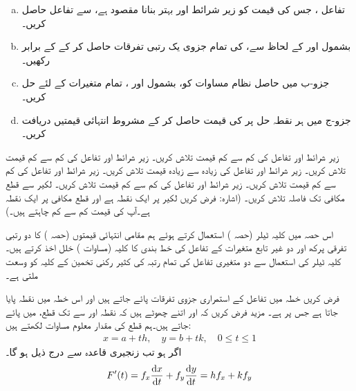 \begin{enumerate}[a.]
\item
تفاعل ،  جس کی قیمت کو زیر شرائط  اور  بہتر بنانا مقصود ہے، سے تفاعل  حاصل کریں۔
\item
 بشمول  اور  کے لحاظ سے،  کی تمام جزوی یک رتبی تفرقات حاصل کر کے  کے برابر رکھیں۔
\item
جزو-ب میں حاصل نظام مساوات کو،  بشمول  اور ،  تمام متغیرات کے لئے حل کریں۔
\item
جزو-ج میں ہر نقطہ حل پر  کی قیمت حاصل کر کے مشروط انتہائی قیمتیں دریافت کریں۔
\end{enumerate}

زیر شرائط  اور   تفاعل   کی کم سے کم قیمت تلاش کریں۔
زیر شرائط  اور   تفاعل   کی کم سے کم قیمت تلاش کریں۔
زیر شرائط  اور   تفاعل   کی زیادہ سے زیادہ  قیمت تلاش کریں۔
زیر شرائط  اور   تفاعل   کی کم سے کم قیمت تلاش کریں۔
زیر شرائط  اور   تفاعل     کی کم سے کم قیمت تلاش کریں۔
لکیر  سے قطع مکافی  تک فاصلہ تلاش کریں۔ (اشارہ: فرض کریں لکیر پر  ایک نقطہ ہے اور  قطع مکافی  پر ایک نقطہ ہے۔آپ  کی قیمت  کم سے کم چاہتے ہیں۔)

اس حصہ میں کلیہ ٹیلر  (حصہ )  استعمال کرتے ہوئے ہم  مقامی انتہائی قیمتوں (حصہ )  کا دو رتبی تفرقی پرکھ اور دو غیر تابع  متغیرات کے تفاعل کی خط بندی   کا کلیہ  (مساوات )   خلل اخذ کرتے ہیں۔ کلیہ ٹیلر کی استعمال  سے  دو متغیری تفاعل کی تمام رتبہ کی  کثیر رکنی تخمین کے کلیہ  کو وسعت ملتی ہے۔ 

فرض کریں  خطہ  میں  تفاعل   کے  استمراری جزوی تفرقات  پائے جاتے ہیں اور اس خطہ میں نقطہ   پایا جاتا ہے جس پر  ہے۔ مزید فرض کریں کہ  اور  اتنے  چھوٹے ہیں کہ نقطہ اور    سے  تک قطع،    میں پائے جاتے ہیں۔ہم قطع   کی مقدار معلوم مساوات لکھتے ہیں:
\begin{align*}
x=a+th,\quad y=b+tk,\quad 0\le t\le 1
\end{align*}
 اگر  ہو  تب زنجیری قاعدہ سے درج ذیل ہو گا۔
\begin{align*}
F'(t)=f_x\frac{\dif x}{\dif t}+f_y\frac{\dif y}{\dif t}=hf_x+kf_y
\end{align*}

